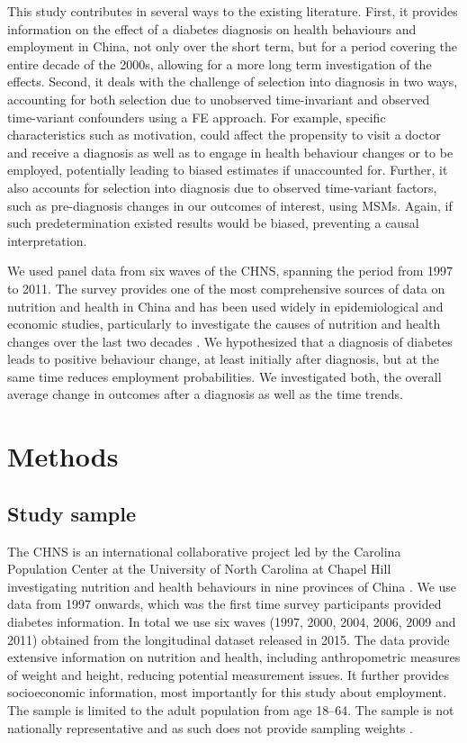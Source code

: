 This study contributes in several ways to the existing literature. First, it provides information on the effect of a diabetes diagnosis on health behaviours and employment in China, not only over the short term, but for a period covering the entire decade of the 2000s, allowing for a more long term investigation of the effects. Second, it deals with the challenge of selection into diagnosis in two ways, accounting for both selection due to unobserved time-invariant and observed time-variant confounders using a \ac{FE} approach. For example, specific characteristics such as motivation, could affect the propensity to visit a doctor and receive a diagnosis as well as to engage in health behaviour changes or to be employed, potentially leading to biased estimates if unaccounted for. Further, it also accounts for selection into diagnosis due to observed time-variant factors, such as pre-diagnosis changes in our outcomes of interest, using \acp{MSM}. Again, if such predetermination existed results would be biased, preventing a causal interpretation.  

We used panel data from six waves of the \acf{CHNS}, spanning the period from 1997 to 2011. The survey provides one of the most comprehensive sources of data on nutrition and health in China and has been used widely in epidemiological and economic studies, particularly to investigate the causes of nutrition and health changes over the last two decades \parencite{Zhang2014d}. We hypothesized that a diagnosis of diabetes leads to positive behaviour change, at least initially after diagnosis, but at the same time reduces employment probabilities. We investigated both, the overall average change in outcomes after a diagnosis as well as the time trends. 
\section{\label{sec:Methods5}Methods}

\subsection*{Study sample}

The \ac{CHNS} is an international collaborative project led by the Carolina Population Center at the University of North Carolina at Chapel Hill investigating nutrition and health behaviours in nine provinces of China \parencite{Zhang2014d}. We use data from 1997 onwards, which was the first time survey participants provided diabetes information. In total we use six waves (1997, 2000, 2004, 2006, 2009 and 2011) obtained from the longitudinal dataset released in 2015. The data provide extensive information on nutrition and health, including anthropometric measures of weight and height, reducing potential measurement issues. It further provides socioeconomic information, most importantly for this study about employment. The sample is limited to the adult population from age 18--64.  The sample is not nationally representative and as such does not provide sampling weights  \parencite{Popkin2010}.


